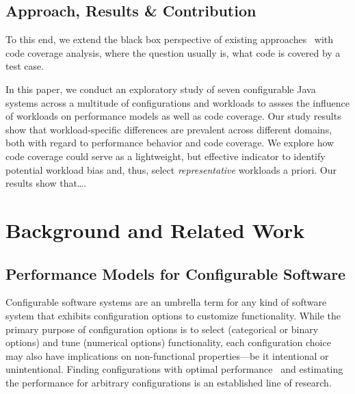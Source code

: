 \subsection*{Approach, Results \& Contribution}
{
	\color{red}
	To this end, we extend the black box perspective of existing approaches~\cite{dorn2020,siegmundPerformanceinfluenceModelsHighly2015,haDeepPerf2019,perfAL,guoVariabilityawarePerformancePrediction2013,sarkarCostEfficientSamplingPerformance,guo_2018_data,fourier_learning_2015,perLasso} with code coverage analysis, where the question usually is, what code is covered by a test case.

In this paper, we conduct an exploratory study of seven configurable Java systems across a multitude of configurations and workloads to assses the influence of workloads on performance models as well as code coverage. 
Our study results show that workload-specific differences are prevalent across different domains, both with regard to performance behavior and code coverage. We explore how code coverage could serve as a lightweight, but effective indicator to identify potential workload bias and, thus, select \emph{representative} workloads a priori. Our results show that\ldots.
}

\section{Background and Related Work}
\subsection{Performance Models for Configurable Software}
Configurable software systems are an umbrella term for any kind of software system that exhibits configuration options to customize functionality. 
While the primary purpose of configuration options is to select (categorical or binary options) and tune (numerical options) functionality, each configuration choice may also have implications on non-functional properties---be it intentional or unintentional. Finding configurations with optimal performance~\cite{nairUsingBadLearners2017,nairFlash18,ohFindingNearoptimalConfigurations2017} and estimating the performance for arbitrary configurations is an established line of research\cite{siegmundPerformanceinfluenceModelsHighly2015,haDeepPerf2019,perfAL,guoVariabilityawarePerformancePrediction2013,sarkarCostEfficientSamplingPerformance,guo_2018_data,fourier_learning_2015,perLasso}. 

